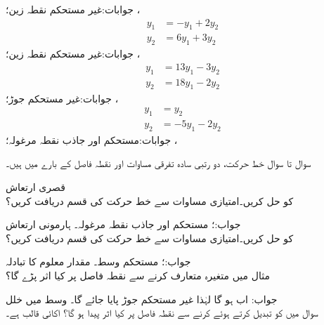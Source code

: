 جوابات:غیر مستحکم نقطہ زین؛ ، 
\begin{align*}
y_1&=-y_1+2y_2\\
y_2&=6y_1+3y_2
\end{align*}
جوابات:غیر مستحکم نقطہ زین؛ ، 
\begin{align*}
y_1&=13y_1-3y_2\\
y_2&=18y_1-2y_2
\end{align*}
جوابات:غیر مستحکم جوڑ؛ ، 
\begin{align*}
y_1&=y_2\\
y_2&=-5y_1-2y_2
\end{align*}
جوابات:مستحکم اور جاذب نقطہ مرغولہ؛ ، \\ 

سوال  تا سوال  خط حرکت، دو رتبی سادہ تفرقی مساوات اور نقطہ فاصل کے بارے میں ہیں۔

 \quad قصری ارتعاش\\
 کو حل کریں۔امتیازی مساوات سے خط حرکت کی قسم دریافت کریں؟

جواب:؛ مستحکم اور جاذب نقطہ مرغولہ۔
 \quad ہارمونی ارتعاش\\
 کو حل کریں۔امتیازی مساوات سے خط حرکت کی قسم دریافت کریں؟

جواب:؛ مستحکم وسط۔
 \quad مقدار معلوم کا تبادلہ\\
مثال  میں متغیرہ  متعارف کرنے سے نقطہ فاصل پر کیا اثر پڑے گا؟

جواب: اب  ہو گا لہٰذا غیر مستحکم جوڑ پایا جائے گا۔
 \quad وسط میں خلل\\
سوال  میں  کو تبدیل کرتے ہوئے  کرنے سے نقطہ فاصل پر کیا اثر پیدا ہو گا؟   اکائی قالب ہے۔ 

